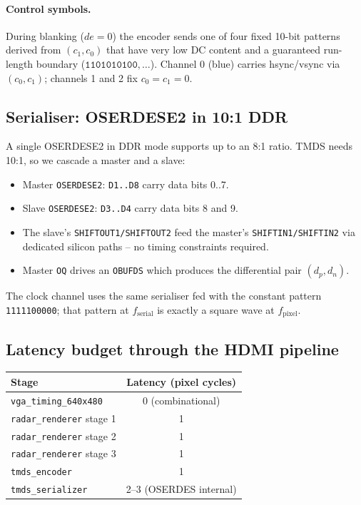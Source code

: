 \documentclass[11pt,a4paper]{article}
\begin{document}
\paragraph{Control symbols.}  During blanking ($de = 0$) the encoder
sends one of four fixed 10-bit patterns derived from
$(c_1, c_0)$ that have very low DC content and a guaranteed run-length
boundary ($\texttt{1101010100}, \ldots$).  Channel 0 (blue) carries
hsync/vsync via $(c_0, c_1)$; channels 1 and 2 fix
$c_0 = c_1 = 0$.

\subsection{Serialiser: OSERDESE2 in 10:1 DDR}

A single OSERDESE2 in DDR mode supports up to an 8:1 ratio.  TMDS needs
10:1, so we cascade a master and a slave:

\begin{itemize}
  \item Master \texttt{OSERDESE2}: \texttt{D1..D8} carry data bits 0..7.
  \item Slave  \texttt{OSERDESE2}: \texttt{D3..D4} carry data bits 8 and 9.
  \item The slave's \texttt{SHIFTOUT1/SHIFTOUT2} feed the master's
        \texttt{SHIFTIN1/SHIFTIN2} via dedicated silicon paths -- no
        timing constraints required.
  \item Master \texttt{OQ} drives an \texttt{OBUFDS} which produces
        the differential pair $(d_p, d_n)$.
\end{itemize}

The clock channel uses the same serialiser fed with the constant
pattern \texttt{1111100000}; that pattern at $f_{\text{serial}}$ is
exactly a square wave at $f_{\text{pixel}}$.

\subsection{Latency budget through the HDMI pipeline}

\begin{table}[h]
\centering
\begin{tabular}{@{}lc@{}}
\toprule
Stage                           & Latency (pixel cycles) \\
\midrule
\texttt{vga\_timing\_640x480}        & 0 (combinational) \\
\texttt{radar\_renderer} stage 1     & 1 \\
\texttt{radar\_renderer} stage 2     & 1 \\
\texttt{radar\_renderer} stage 3     & 1 \\
\texttt{tmds\_encoder}                & 1 \\
\texttt{tmds\_serializer}             & 2--3 (OSERDES internal) \\
\bottomrule
\end{tabular}
\end{table}
\end{document}
